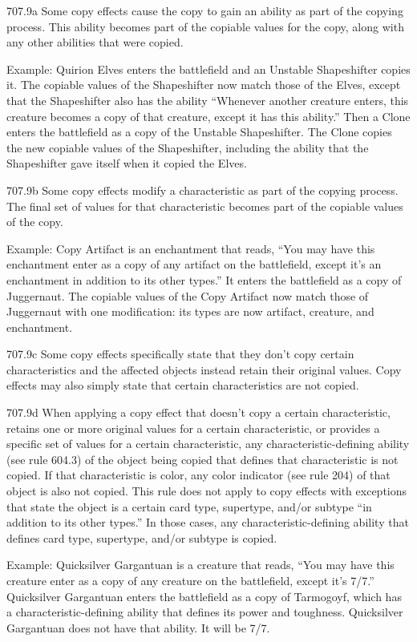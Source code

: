 707.9a Some copy effects cause the copy to gain an ability as part of the copying process. This ability becomes part of the copiable values for the copy, along with any other abilities that were copied.

Example: Quirion Elves enters the battlefield and an Unstable Shapeshifter copies it. The copiable values of the Shapeshifter now match those of the Elves, except that the Shapeshifter also has the ability “Whenever another creature enters, this creature becomes a copy of that creature, except it has this ability.” Then a Clone enters the battlefield as a copy of the Unstable Shapeshifter. The Clone copies the new copiable values of the Shapeshifter, including the ability that the Shapeshifter gave itself when it copied the Elves.

707.9b Some copy effects modify a characteristic as part of the copying process. The final set of values for that characteristic becomes part of the copiable values of the copy.

Example: Copy Artifact is an enchantment that reads, “You may have this enchantment enter as a copy of any artifact on the battlefield, except it’s an enchantment in addition to its other types.” It enters the battlefield as a copy of Juggernaut. The copiable values of the Copy Artifact now match those of Juggernaut with one modification: its types are now artifact, creature, and enchantment.

707.9c Some copy effects specifically state that they don’t copy certain characteristics and the affected objects instead retain their original values. Copy effects may also simply state that certain characteristics are not copied.

707.9d When applying a copy effect that doesn’t copy a certain characteristic, retains one or more original values for a certain characteristic, or provides a specific set of values for a certain characteristic, any characteristic-defining ability (see rule 604.3) of the object being copied that defines that characteristic is not copied. If that characteristic is color, any color indicator (see rule 204) of that object is also not copied. This rule does not apply to copy effects with exceptions that state the object is a certain card type, supertype, and/or subtype “in addition to its other types.” In those cases, any characteristic-defining ability that defines card type, supertype, and/or subtype is copied.

Example: Quicksilver Gargantuan is a creature that reads, “You may have this creature enter as a copy of any creature on the battlefield, except it’s 7/7.” Quicksilver Gargantuan enters the battlefield as a copy of Tarmogoyf, which has a characteristic-defining ability that defines its power and toughness. Quicksilver Gargantuan does not have that ability. It will be 7/7.


